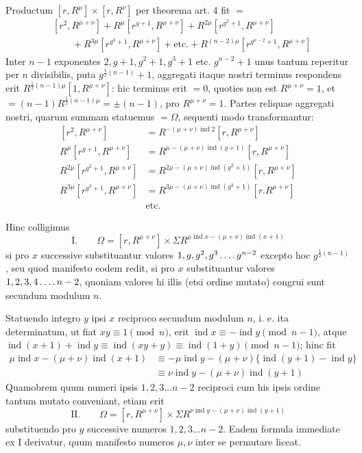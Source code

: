 Productum $[r,R^\mu]\times[r,R^\nu]$ per theorema art. 4 fit $=$
%
\[
\begin{aligned}
&[r^2,R^{\mu+\nu}]+R^\mu[r^{g+1},R^{\mu+\nu}]+R^{2\mu}[r^{g^2+1},R^{\mu+\nu}]\\
&\qquad+R^{3\mu}[r^{g^3+1},R^{\mu+\nu}]+\text{etc.}+R^{(n-2)\mu}[r^{g^{n-2}+1},R^{\mu+\nu}]
\end{aligned}
\]
Inter $n-1$ exponentes $2,g+1,g^2+1,g^3+1$ etc. $g^{n-2}+1$ unus tantum reperitur per $n$ divisibilis, puta $g^{\frac12(n-1)}+1$, aggregati itaque nostri terminus respondens erit $R^{\frac12(n-1)\mu}[1,R^{\mu+\nu}]$: hic terminus erit $=0$, quoties non est $R^{\mu+\nu}=1$, et $=(n-1)R^{\frac12(n-1)\mu}=\pm(n-1)$, pro $R^{\mu+\nu}=1$. Partes reliquae aggregati nostri, quarum summam statuemus $=\Omega$, sequenti modo transformantur:
\[
\begin{aligned}
[r^2,R^{\mu+\nu}]&=R^{-(\mu+\nu)\operatorname{ind}2}[r,R^{\mu+\nu}]\\
R^\mu[r^{g+1},R^{\mu+\nu}]&=R^{\mu-(\mu+\nu)\operatorname{ind}(g+1)}[r,R^{\mu+\nu}]\\
R^{2\mu}[r^{g^2+1},R^{\mu+\nu}]&=R^{2\mu-(\mu+\nu)\operatorname{ind}(g^2+1)}[r,R^{\mu+\nu}]\\
R^{3\mu}[r^{g^3+1},R^{\mu+\nu}]&=R^{3\mu-(\mu+\nu)\operatorname{ind}(g^3+1)}[r.R^{\mu+\nu}]\\
&\text{etc.}
\end{aligned}
\]

Hinc colligimus
\[
\text{I.}\qquad\Omega=[r,R^{\mu+\nu}]\times\Sigma R^{\mu\operatorname{ind}x-(\mu+\nu)\operatorname{ind}(x+1)}
\]
si pro $x$ successive substituantur valores $1,g,g^2,g^3\mathinner{.\,.\,.\,.} g^{n-2}$ excepto hoc $g^{\frac12(n-1)}$, seu quod manifesto eodem redit, si pro $x$ substituantur valores $1,2,3,4\mathinner{.\,.\,.\,.} n-2$, quoniam valores hi illis (etsi ordine mutato) congrui sunt secundum modulum $n$.

Statuendo integro $y$ ipsi $x$ reciproco secundum modulum $n$, i. e. ita determinatum, ut fiat $xy\equiv1\pmod n$, erit $\operatorname{ind}x\equiv-\operatorname{ind}y\pmod{n-1}$, atque $\operatorname{ind}(x+1)+\operatorname{ind}y\equiv\operatorname{ind}(xy+y)\equiv\operatorname{ind}(1+y)\pmod{n-1}$; hinc fit
\[
\begin{aligned}
\mu\operatorname{ind}x-(\mu+\nu)\operatorname{ind}(x+1)&\equiv-\mu\operatorname{ind}y-(\mu+\nu)\{\operatorname{ind}(y+1)-\operatorname{ind}y\}\\
&\equiv\nu\operatorname{ind}y-(\mu+\nu)\operatorname{ind}(y+1)
\end{aligned}
\]
Quamobrem quum numeri ipsis $1,2,3\dots n-2$ reciproci cum his ipsis ordine tantum mutato conveniant, etiam erit
\[
\text{II.}\qquad\Omega=[r,R^{\mu+\nu}]\times\Sigma R^{\nu\operatorname{ind}y-(\mu+\nu)\operatorname{ind}(y+1)}
\]
substituendo pro $y$ successive numeros $1,2,3\dots n-2$. Eadem formula immediate ex I derivatur, quum manifesto numeros $\mu,\nu$ inter se permutare liceat.

